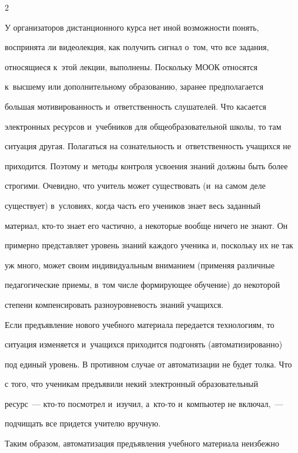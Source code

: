\begin{multicols}{2}
  


  У организаторов дистанционного курса нет иной возможности понять, 


воспринята ли видеолекция, как получить сигнал о~том, что все задания, 


относящиеся к~этой лекции, выполнены. Поскольку МООК относятся 


к~высшему или дополнительному образованию, заранее предполагается 


большая мотивированность и~ответственность слушателей. Что касается 


электронных ресурсов и~учебников для общеобразовательной школы, то там 


ситуация другая. Полагаться на сознательность и~ответственность учащихся не 


приходится. Поэтому и~методы контроля усвоения знаний должны быть более 


строгими. Очевидно, что учитель может существовать (и~на самом деле 


существует) в~условиях, когда часть его учеников знает весь заданный 


материал, кто-то знает его частично, а некоторые вообще ничего не знают. Он 


примерно представляет уровень знаний каждого ученика и, поскольку их не так 


уж много, может своим индивидуальным вниманием (применяя различные 


педагогические приемы, в~том числе формирующее обучение) до некоторой 


степени компенсировать разноуровневость знаний учащихся.


  


  Если предъявление нового учебного материала передается технологиям, то 


ситуация изменяется и~учащихся приходится подгонять (автоматизированно) 


под единый уровень. В противном случае от автоматизации не будет толка. Что 


с того, что ученикам предъявили некий электронный образовательный  


ресурс~--- кто-то посмотрел и~изучил, а~кто-то и~компьютер не включал,~--- 


подчищать все придется учителю вручную.


  


  Таким образом, автоматизация предъявления учебного материала неизбежно 



\end{multicols}
